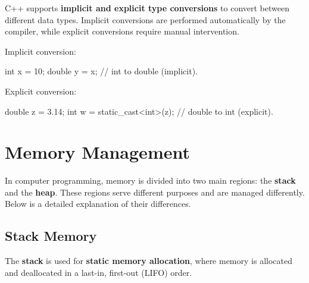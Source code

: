 C++ supports \textbf{implicit and explicit type conversions} to convert between different data types. Implicit conversions are performed automatically by the compiler, while explicit conversions require manual intervention.

\begin{exampleblock}
    Implicit conversion:
    \begin{codeblock}[language=C++]
int x = 10;
double y = x; // int to double (implicit).
    \end{codeblock}
    Explicit conversion:
    \begin{codeblock}[language=C++]
double z = 3.14;
int w = static_cast<int>(z); // double to int (explicit).
    \end{codeblock}
\end{exampleblock}

\vspace{-0.8em}

\section{Memory Management}

In computer programming, memory is divided into two main regions: the \textbf{stack} and the \textbf{heap}. These regions serve different purposes and are managed differently. Below is a detailed explanation of their differences.

\vspace{-0.5em}

\subsection{Stack Memory}

The \textbf{stack} is used for \textbf{static memory allocation}, where memory is allocated and deallocated in a last-in, first-out (LIFO) order.

\vspace{-0.5em} 


